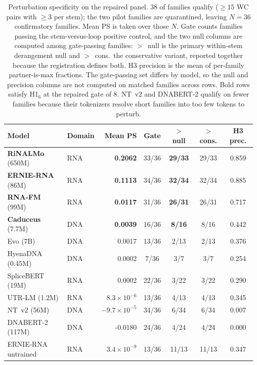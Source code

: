 \begin{table}[htbp]
\centering
\caption{Perturbation specificity on the repaired panel. 38 of \panelN{} families qualify ($\geq 15$ WC pairs with $\geq 3$ per stem); the two pilot families are quarantined, leaving $N = 36$ confirmatory families. Mean PS is taken over those $N$. Gate counts families passing the stem-versus-loop positive control, and the two null columns are computed among gate-passing families: $>$~null is the primary within-stem derangement null and $>$~cons.\ the conservative variant, reported together because the registration defines both. H3 precision is the mean of per-family partner-is-max fractions. The gate-passing set differs by model, so the null and precision columns are not computed on matched families across rows. Bold rows satisfy H1$_6$ at the repaired gate of 8. NT~v2 and DNABERT-2 qualify on fewer families because their tokenizers resolve short families into too few tokens to perturb.}
\label{tab:rung3}
\small
\begin{tabular}{llrcccc}
\toprule
\textbf{Model} & \textbf{Domain} & \textbf{Mean PS} & \textbf{Gate} & \textbf{$>$ null} & \textbf{$>$ cons.} & \textbf{H3 prec.} \\
\midrule
\textbf{RiNALMo} (650M)      & RNA & \textbf{0.2062} & 33/36 & \textbf{29/33} & 29/33 & 0.859 \\
\textbf{ERNIE-RNA} (86M)     & RNA & \textbf{0.1113} & 34/36 & \textbf{32/34} & 32/34 & 0.885 \\
\textbf{RNA-FM} (99M)        & RNA & \textbf{0.0117} & 31/36 & \textbf{26/31} & 26/31 & 0.717 \\
\textbf{Caduceus} (7.7M)     & DNA & \textbf{0.0039} & 16/36 & \textbf{8/16} & 8/16 & 0.442 \\
Evo (7B)                     & DNA & 0.0017 & 13/36 & 2/13 & 2/13 & 0.376 \\
HyenaDNA (0.45M)             & DNA & 0.0002 & 7/36 & 3/7 & 3/7 & 0.254 \\
SpliceBERT (19M)             & RNA & 0.0002 & 22/36 & 3/22 & 3/22 & 0.290 \\
UTR-LM (1.2M)                & RNA & $8.3 \times 10^{-6}$ & 13/36 & 4/13 & 4/13 & 0.345 \\
NT~v2 (56M)                  & DNA & $-9.7 \times 10^{-5}$ & 34/36 & 6/34 & 6/34 & 0.007 \\
DNABERT-2 (117M)             & DNA & -0.0180 & 24/36 & 4/24 & 4/24 & 0.000 \\
\midrule
ERNIE-RNA untrained          & RNA & $3.4 \times 10^{-9}$ & 13/36 & 11/13 & 11/13 & 0.347 \\

\end{tabular}
\end{table}
